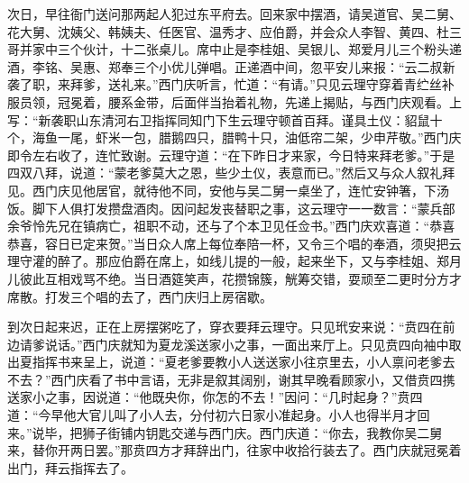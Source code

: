 次日，早往衙门送问那两起人犯过东平府去。回来家中摆酒，请吴道官、吴二舅、花大舅、沈姨父、韩姨夫、任医官、温秀才、应伯爵，并会众人李智、黄四、杜三哥并家中三个伙计，十二张桌儿。席中止是李桂姐、吴银儿、郑爱月儿三个粉头递酒，李铭、吴惠、郑奉三个小优儿弹唱。正递酒中间，忽平安儿来报：“云二叔新袭了职，来拜爹，送礼来。”西门庆听言，忙道：“有请。”只见云理守穿着青纻丝补服员领，冠冕着，腰系金带，后面伴当抬着礼物，先递上揭贴，与西门庆观看。上写：“新袭职山东清河右卫指挥同知门下生云理守顿首百拜。谨具土仪：貂鼠十个，海鱼一尾，虾米一包，腊鹅四只，腊鸭十只，油低帘二架，少申芹敬。”西门庆即令左右收了，连忙致谢。云理守道：“在下昨日才来家，今日特来拜老爹。”于是四双八拜，说道：“蒙老爹莫大之恩，些少土仪，表意而已。”然后又与众人叙礼拜见。西门庆见他居官，就待他不同，安他与吴二舅一桌坐了，连忙安钟箸，下汤饭。脚下人俱打发攒盘酒肉。因问起发丧替职之事，这云理守一一数言：“蒙兵部余爷怜先兄在镇病亡，祖职不动，还与了个本卫见任佥书。”西门庆欢喜道：“恭喜恭喜，容日已定来贺。”当日众人席上每位奉陪一杯，又令三个唱的奉酒，须臾把云理守灌的醉了。那应伯爵在席上，如线儿提的一般，起来坐下，又与李桂姐、郑月儿彼此互相戏骂不绝。当日酒筵笑声，花攒锦簇，觥筹交错，耍顽至二更时分方才席散。打发三个唱的去了，西门庆归上房宿歇。

到次日起来迟，正在上房摆粥吃了，穿衣要拜云理守。只见玳安来说：“贲四在前边请爹说话。”西门庆就知为夏龙溪送家小之事，一面出来厅上。只见贲四向袖中取出夏指挥书来呈上，说道：“夏老爹要教小人送送家小往京里去，小人禀问老爹去不去？”西门庆看了书中言语，无非是叙其阔别，谢其早晚看顾家小，又借贲四携送家小之事，因说道：“他既央你，你怎的不去！”因问：“几时起身？”贲四道：“今早他大官儿叫了小人去，分付初六日家小准起身。小人也得半月才回来。”说毕，把狮子街铺内钥匙交递与西门庆。西门庆道：“你去，我教你吴二舅来，替你开两日罢。”那贲四方才拜辞出门，往家中收拾行装去了。西门庆就冠冕着出门，拜云指挥去了。

